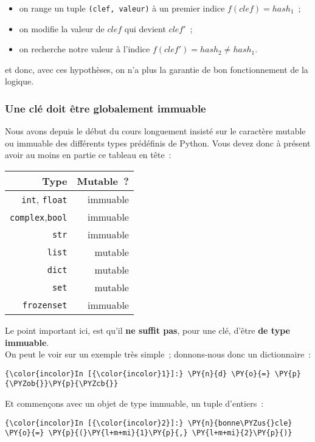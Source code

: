 \begin{itemize}
	\item 
	on range un tuple \texttt{(clef,\ valeur)} à un premier
	indice \(f(clef) = hash_1\)~;
	\item
	on modifie la valeur de \(clef\) qui
	devient \(clef'\)~;
	\item
	on recherche notre valeur à l'indice
	\(f(clef') = hash_2 \neq hash_1\).
\end{itemize}

et donc, avec ces hypothèses, on n'a plus la garantie de bon
fonctionnement de la logique.

    \hypertarget{une-cluxe9-doit-uxeatre-globalement-immuable}{%
\subsubsection{Une clé doit être globalement
immuable}\label{une-cluxe9-doit-uxeatre-globalement-immuable}}

    Nous avons depuis le début du cours longuement insisté sur le caractère
mutable ou immuable des différents types prédéfinis de Python. Vous
devez donc à présent avoir au moins en partie ce tableau en tête~:

\begin{longtable}[]{@{}rr@{}}
\toprule
Type & Mutable~?\tabularnewline
\midrule
\endhead
\texttt{int}, \texttt{float} & immuable\tabularnewline
\texttt{complex},\texttt{bool} & immuable\tabularnewline
\texttt{str} & immuable\tabularnewline
\texttt{list} & mutable\tabularnewline
\texttt{dict} & mutable\tabularnewline
\texttt{set} & mutable\tabularnewline
\texttt{frozenset} & immuable\tabularnewline
\bottomrule
\end{longtable}

    Le point important ici, est qu'il \textbf{ne suffit pas}, pour une clé,
d'être \textbf{de type immuable}.\\

On peut le voir sur un exemple très simple~; donnons-nous donc un
dictionnaire~:

    \begin{Verbatim}[commandchars=\\\{\}]
{\color{incolor}In [{\color{incolor}1}]:} \PY{n}{d} \PY{o}{=} \PY{p}{\PYZob{}}\PY{p}{\PYZcb{}}
\end{Verbatim}


    Et commençons avec un objet de type immuable, un tuple d'entiers~:

    \begin{Verbatim}[commandchars=\\\{\}]
{\color{incolor}In [{\color{incolor}2}]:} \PY{n}{bonne\PYZus{}cle} \PY{o}{=} \PY{p}{(}\PY{l+m+mi}{1}\PY{p}{,} \PY{l+m+mi}{2}\PY{p}{)}
\end{Verbatim}


